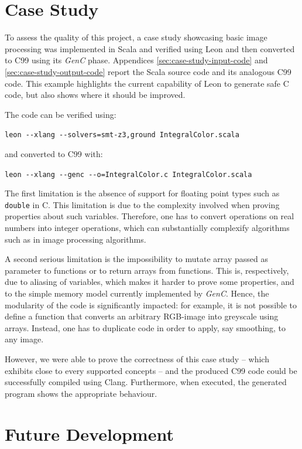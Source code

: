 \documentclass{article}
\newcommand{\inlinecode}[1]{\lstinline[basicstyle=\ttfamily]|#1|}
\newcommand{\inlineC}[1]{\lstinline[language=C99]|#1|}
\newcommand{\GenC}{\emph{GenC}\xspace}
\begin{document}
\section{Case Study}
\label{sec:case-study}

To assess the quality of this project, a case study showcasing basic image
processing was implemented in Scala and verified using Leon and then converted
to C99 using its \GenC phase. Appendices \ref{sec:case-study-input-code} and
\ref{sec:case-study-output-code} report the Scala source code and its analogous
C99 code. This example highlights the current capability of Leon to generate
safe C code, but also shows where it should be improved.

The code can be verified using: \newline \centerline{ \inlinecode{leon --xlang
--solvers=smt-z3,ground IntegralColor.scala} } \newline and converted to C99
with: \newline \centerline{\inlinecode{leon --xlang --genc --o=IntegralColor.c
IntegralColor.scala}}

The first limitation is the absence of support for floating point types such as
\inlineC{double} in C. This limitation is due to the complexity involved when
proving properties about such variables. Therefore, one has to convert
operations on real numbers into integer operations, which can substantially
complexify algorithms such as in image processing algorithms.

A second serious limitation is the impossibility to mutate array passed as
parameter to functions or to return arrays from functions. This is,
respectively, due to aliasing of variables, which makes it harder to prove some
properties, and to the simple memory model currently implemented by \GenC.
Hence, the modularity of the code is significantly impacted: for example, it is
not possible to define a function that converts an arbitrary RGB-image into
greyscale using arrays. Instead, one has to duplicate code in order to apply,
say smoothing, to any image.

However, we were able to prove the correctness of this case study -- which
exhibits close to every supported concepts -- and the produced C99 code could be
successfully compiled using Clang. Furthermore, when executed, the generated
program shows the appropriate behaviour.



\section{Future Development}
\end{document}
